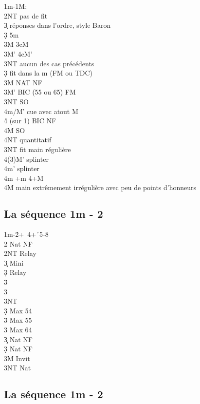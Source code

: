 \documentclass[a4paper]{article}
\begin{document}
\begin{bidtable}
1m-1M;\\
2NT \> pas de fit\+\\
3\c \> réponses dans l'ordre, style Baron\+\\
3\d \> 5m\\
3M \> 3cM\\
3M' \> 4cM'\\
3NT \> aucun des cas précédents\-\\
3\d \> fit dans la m (FM ou TDC)\\
3M \> NAT NF\\
3M' \> BIC (55 ou 65) FM\\
3NT \> SO\\
4m/M' \> cue avec atout M\\
4\h \> (sur 1\s ) BIC NF\\
4M \> SO\\
4NT \> quantitatif\-\\
3NT \> fit main régulière\\
4(3)M’ \> splinter\\
4m’ \> splinter\\
4m +m 4+M\\
4M \> main extrêmement irrégulière avec peu de points d’honneurs
\end{bidtable}

\subsection{La séquence 1m - 2\pdfh}

\begin{bidtable}
1m-2\h {}+\s\ 4+\h\ 5-8\+\\
2\s \> Nat NF\\
2NT \> Relay\+\\
3\c \> Mini\+\\
3\d \> Relay\+\\
3\h {}\\
3\s {}\\
3NT \-\-\\
3\d \> Max 54\\
3\h \> Max 55\\
3\s \> Max 64\-\\
3\c \> Nat NF\\
3\d \> Nat NF\\
3M \> Invit\\
3NT \> Nat\-
\end{bidtable}

\subsection{La séquence 1m - 2\pdfs}
\end{document}
